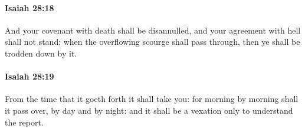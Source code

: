 		\paragraph{Isaiah 28:18} %
			\label{ISAIAH-28-18}

			And your covenant with death shall be disannulled, and your agreement with hell shall not stand; when the overflowing scourge shall pass through, then ye shall be trodden down by it.


		\paragraph{Isaiah 28:19} %
			\label{ISAIAH-28-19}

			From the time that it goeth forth it shall take you: for morning by morning shall it pass over, by day and by night: and it shall be a vexation only to understand the report.


